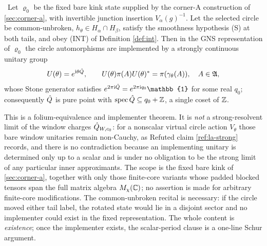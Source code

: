 \begin{theorem}
\label{thm:la-folium}
\statusProved\
Let $\varrho_0$ be the fixed bare kink state supplied by the corner-A
construction of \cref{sec:corner-a}, with invertible junction insertion
$V_\alpha(g)^{-1}$. Let the selected circle be common-unbroken,
$h_\theta\in H_\alpha\cap H_\beta$, satisfy the smoothness hypothesis (S) at
both tails, and obey (INT) of Definition \ref{def:int}. Then in the GNS
representation of $\varrho_0$ the circle automorphisms are implemented by a
strongly continuous unitary group
\begin{equation}
  U(\theta)=e^{\mathrm{i}\theta\hat{Q}},\qquad
  U(\theta)\pi(A)U(\theta)^{*}=\pi(\gamma_\theta(A)),\quad A\in\mathfrak{A} ,
  \label{eq:implementer}
\end{equation}
whose Stone generator satisfies
$e^{2\pi\mathrm{i}\Qhat}=e^{2\pi\mathrm{i}q_0}\mathbb{1}$ for some real
$q_0$; consequently $\hat{Q}$ is pure point with
$\operatorname{spec}\hat{Q}\subseteq q_0+\mathbb{Z}$, a single coset of $\mathbb{Z}$.
\end{theorem}

\begin{scope}
This is a folium-equivalence and implementer theorem. It is \emph{not} a
strong-resolvent limit of the window charges $\hat{Q}_{W,c_0}$: for a nonscalar
virtual circle action $V_\theta$ those bare window unitaries remain
non-Cauchy, as Refuted claim \ref{ref:la-strong} records, and there is no
contradiction because an implementing unitary is determined only up to a
scalar and is under no obligation to be the strong limit of any particular
inner approximants. The scope is the fixed bare kink of \cref{sec:corner-a},
together with only those finite-core variants whose padded blocked tensors
span the full matrix algebra $M_\chi(\mathbb{C})$; no assertion is made for arbitrary
finite-core modifications. The common-unbroken recital is necessary: if the
circle moved either tail label, the rotated state would lie in a disjoint
sector and no implementer could exist in the fixed representation. The whole
content is \emph{existence}; once the implementer exists, the scalar-period
clause is a one-line Schur argument.
\end{scope}

